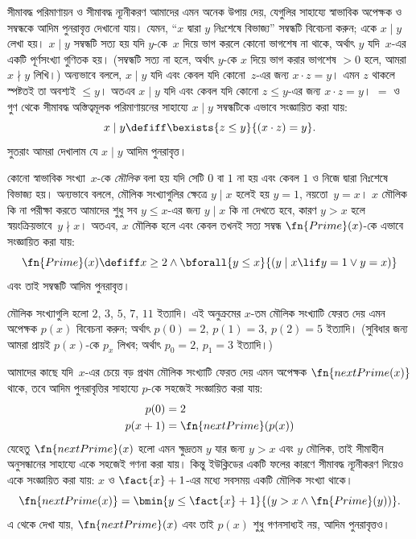 \documentclass[../../../include/open-logic-section]{subfiles}
\begin{document}

সীমাবদ্ধ পরিমাণায়ন ও সীমাবদ্ধ ন্যূনীকরণ আমাদের এমন অনেক উপায় দেয়,
যেগুলির সাহায্যে স্বাভাবিক অপেক্ষক ও সম্বন্ধকে আদিম পুনরাবৃত্ত দেখানো যায়।
যেমন, “$x$ দ্বারা $y$ নিঃশেষে বিভাজ্য” সম্বন্ধটি বিবেচনা করুন; একে
$x \mid y$ লেখা হয়। $x \mid y$ সম্বন্ধটি সত্য হয় যদি $y$-কে~$x$
দিয়ে ভাগ করলে কোনো ভাগশেষ না থাকে, অর্থাৎ $y$ যদি~$x$-এর একটি
পূর্ণসংখ্যা গুণিতক হয়। (সম্বন্ধটি সত্য না হলে, অর্থাৎ $y$-কে $x$ দিয়ে
ভাগ করার ভাগশেষ $> 0$ হলে, আমরা $x \nmid y$ লিখি।) অন্যভাবে বললে,
$x \mid y$ যদি এবং কেবল যদি কোনো~$z$-এর জন্য $x \cdot z = y$। এমন
$z$ থাকলে স্পষ্টতই তা অবশ্যই $\leq y$। অতএব $x \mid y$ যদি এবং কেবল যদি কোনো $z \le y$-এর জন্য
$x \cdot z = y$। $=$ ও গুণ থেকে সীমাবদ্ধ অস্তিত্বমূলক পরিমাণায়নের
সাহায্যে $x \mid y$ সম্বন্ধটিকে এভাবে সংজ্ঞায়িত করা যায়:
\[
x \mid y \defiff \bexists{z \leq y}{(x \cdot z) = y}.
\]
সুতরাং আমরা দেখালাম যে $x \mid y$ আদিম পুনরাবৃত্ত।

কোনো স্বাভাবিক সংখ্যা~$x$-কে
\emph{মৌলিক} বলা হয় যদি সেটি $0$ বা $1$ না হয় এবং কেবল $1$ ও নিজে
দ্বারা নিঃশেষে বিভাজ্য হয়। অন্যভাবে বললে, মৌলিক সংখ্যাগুলির ক্ষেত্রে
$y \mid x$ হলেই হয় $y = 1$, নয়তো~$y=x$। $x$ মৌলিক কি না পরীক্ষা
করতে আমাদের শুধু সব $y \le x$-এর জন্য $y \mid x$ কি না দেখতে হবে,
কারণ $y > x$ হলে স্বয়ংক্রিয়ভাবে~$y \nmid x$। অতএব, $x$ মৌলিক হলে
এবং কেবল তখনই সত্য সম্বন্ধ $\fn{Prime}(x)$-কে এভাবে সংজ্ঞায়িত করা যায়:
\[
\fn{Prime}(x) \defiff x \geq 2 \land \bforall{y \leq x}{(y \mid x \lif y
  = 1 \lor y = x)}
\]
এবং তাই সম্বন্ধটি আদিম পুনরাবৃত্ত।

মৌলিক সংখ্যাগুলি হলো $2$, $3$, $5$, $7$, $11$ ইত্যাদি। এই অনুক্রমের
$x$-তম মৌলিক সংখ্যাটি ফেরত দেয় এমন অপেক্ষক $p(x)$ বিবেচনা করুন;
অর্থাৎ $p(0) = 2$, $p(1) = 3$, $p(2) = 5$ ইত্যাদি। (সুবিধার জন্য
আমরা প্রায়ই $p(x)$-কে $p_x$ লিখব; অর্থাৎ $p_0=2$, $p_1=3$ ইত্যাদি।)

আমাদের কাছে যদি~$x$-এর চেয়ে বড় প্রথম মৌলিক সংখ্যাটি ফেরত দেয় এমন
অপেক্ষক $\fn{nextPrime(x)}$ থাকে, তবে আদিম পুনরাবৃত্তির সাহায্যে $p$-কে
সহজেই সংজ্ঞায়িত করা যায়:
\begin{align*}
  p(0) & = 2\\
  p(x+1) & = \fn{nextPrime}(p(x))
\end{align*}
যেহেতু $\fn{nextPrime}(x)$ হলো এমন ক্ষুদ্রতম $y$ যার জন্য $y > x$ এবং
$y$ মৌলিক, তাই সীমাহীন অনুসন্ধানের সাহায্যে একে সহজেই গণনা করা যায়।
কিন্তু ইউক্লিডের একটি ফলের কারণে সীমাবদ্ধ ন্যূনীকরণ দিয়েও একে সংজ্ঞায়িত
করা যায়: $x$ ও $\fact{x}+1$-এর মধ্যে সবসময় একটি মৌলিক সংখ্যা থাকে।
\[
  \fn{nextPrime(x)} =
  \bmin{y \leq \fact{x}+1}{(y > x \land \fn{Prime}(y))}.
\]
এ থেকে দেখা যায়, $\fn{nextPrime}(x)$ এবং তাই $p(x)$ শুধু গণনসাধ্যই
নয়, আদিম পুনরাবৃত্তও।
\end{document}
